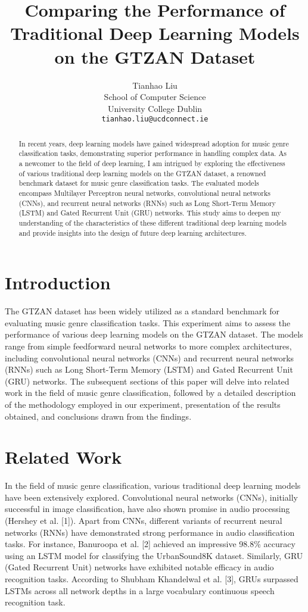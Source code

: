 \documentclass{article}
\title{Comparing the Performance of Traditional Deep Learning Models on the GTZAN Dataset}
\author{%
  Tianhao Liu \\
  School of Computer Science\\
  University College Dublin\\
  \texttt{tianhao.liu@ucdconnect.ie} \\
}
\begin{document}
\maketitle

\begin{abstract}
  In recent years, deep learning models have gained widespread adoption for music genre classification tasks, demonstrating superior performance in handling complex data. 
  As a newcomer to the field of deep learning, I am intrigued by exploring the effectiveness of various traditional deep learning models on the GTZAN dataset, a renowned benchmark dataset for music genre classification tasks.
  The evaluated models encompass Multilayer Perceptron neural networks, convolutional neural networks (CNNs), and recurrent neural networks (RNNs) such as Long Short-Term Memory (LSTM) and Gated Recurrent Unit (GRU) networks. 
  This study aims to deepen my understanding of the characteristics of these different traditional deep learning models and provide insights into the design of future deep learning architectures.
\end{abstract}

\section{Introduction}

The GTZAN dataset has been widely utilized as a standard benchmark for evaluating music genre classification tasks. 
This experiment aims to assess the performance of various deep learning models on the GTZAN dataset. 
The models range from simple feedforward neural networks to more complex architectures, including convolutional neural networks (CNNs) and recurrent neural networks (RNNs) such as Long Short-Term Memory (LSTM) and Gated Recurrent Unit (GRU) networks.
The subsequent sections of this paper will delve into related work in the field of music genre classification, followed by a detailed description of the methodology employed in our experiment, presentation of the results obtained, and conclusions drawn from the findings.

\section{Related Work}
In the field of music genre classification, various traditional deep learning models have been extensively explored. 
Convolutional neural networks (CNNs), initially successful in image classification, have also shown promise in audio processing (Hershey et al. [1]). 
Apart from CNNs, different variants of recurrent neural networks (RNNs) have demonstrated strong performance in audio classification tasks. 
For instance, Banuroopa et al. [2] achieved an impressive 98.8\% accuracy using an LSTM model for classifying the UrbanSound8K dataset. 
Similarly, GRU (Gated Recurrent Unit) networks have exhibited notable efficacy in audio recognition tasks. 
According to Shubham Khandelwal et al. [3], GRUs surpassed LSTMs across all network depths in a large vocabulary continuous speech recognition task.
\end{document}
